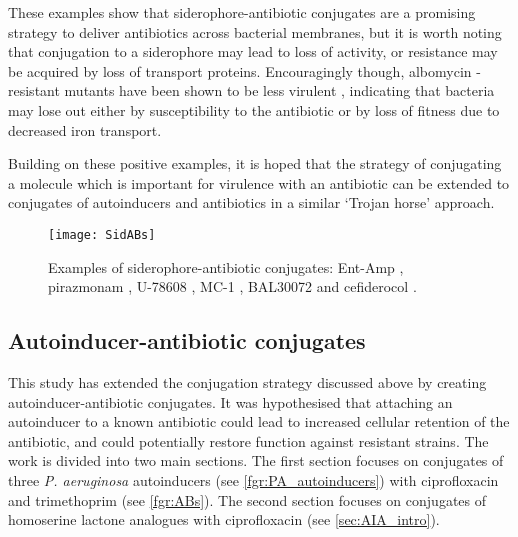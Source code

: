 These examples show that siderophore-antibiotic conjugates are a promising strategy to deliver antibiotics across bacterial membranes, but it is worth noting that conjugation to a siderophore may lead to loss of activity, or resistance may be acquired by loss of transport proteins. Encouragingly though, albomycin -resistant mutants have been shown to be less virulent \cite{Pramanik2007}, indicating that bacteria may lose out either by susceptibility to the antibiotic or by loss of fitness due to decreased iron transport. 

Building on these positive examples, it is hoped that the strategy of conjugating a molecule which is important for virulence\cite{Vasil1999} with an antibiotic can be extended to conjugates of autoinducers and antibiotics in a similar `Trojan horse' approach.

\begin{figure}[H]
	\begin{center}
		\texttt{[image: SidABs]}
		\caption{Examples of siderophore-antibiotic conjugates: Ent-Amp \cite{Zheng2014}, 
		pirazmonam \cite{Zurenko1990,Harrington2012}, 
		U-78608 ,\cite{Zurenko1990,Harrington2012} 
		MC-1 \cite{McPherson2012},  
		BAL30072 \cite{Page2013}
		and cefiderocol \cite{Ito2018,Saisho2018}.
		\label{fgr:SidABs}}
	\end{center}
\end{figure}



\subsection{Autoinducer-antibiotic conjugates\label{sec:AIABs}}


This study has extended the conjugation strategy discussed above by creating autoinducer-antibiotic conjugates. It was hypothesised that attaching an autoinducer to a known antibiotic could lead to increased cellular retention of the antibiotic, and could potentially restore function against resistant strains.
The work is divided into two main sections. The first section focuses on conjugates of three \textit{P. aeruginosa} autoinducers (see \ref{fgr:PA_autoinducers}) with ciprofloxacin and trimethoprim (see \ref{fgr:ABs}).
The second section focuses on conjugates of homoserine lactone analogues with ciprofloxacin (see \ref{sec:AIA_intro}).

